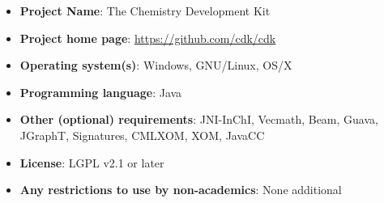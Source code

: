 \documentclass[10pt]{bmcart}
\begin{document}
\begin{itemize}
\item \textbf{Project Name}: The Chemistry Development Kit
\item \textbf{Project home page}: \url{https://github.com/cdk/cdk}
\item \textbf{Operating system(s)}: Windows, GNU/Linux, OS/X
\item \textbf{Programming language}: Java
\item \textbf{Other (optional) requirements}: JNI-InChI, Vecmath, Beam, Guava, JGraphT, Signatures, CMLXOM, XOM, JavaCC
\item \textbf{License}: LGPL v2.1 or later
\item \textbf{Any restrictions to use by non-academics}: None additional
\end{itemize}

\end{document}
